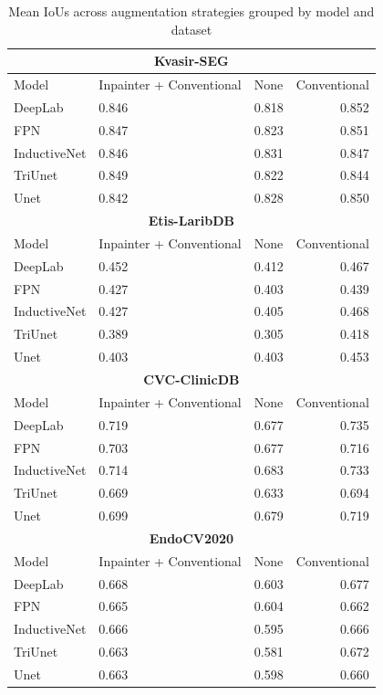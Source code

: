 \begin{table}[h!]
    \centering
   \begin{tabularx}{\linewidth}{llXr}
\toprule
        \multicolumn{4}{c}{\textbf{Kvasir-SEG}}\\
\toprule
Model & Inpainter + Conventional & None & Conventional\\
\midrule
            DeepLab &  0.846 &  0.818 &  0.852 \\
            FPN &  0.847 &  0.823 &  0.851 \\
           InductiveNet &  0.846 &  0.831 &  0.847 \\
           TriUnet &  0.849 &  0.822 &  0.844 \\
           Unet &  0.842 &  0.828 &  0.850 \\

\toprule
        \multicolumn{4}{c}{\textbf{Etis-LaribDB}}\\
\toprule
Model & Inpainter + Conventional & None & Conventional\\
\midrule
           DeepLab &  0.452 &  0.412 &  0.467 \\
           FPN &  0.427 &  0.403 &  0.439 \\
           InductiveNet &  0.427 &  0.405 &  0.468 \\
           TriUnet &  0.389 &  0.305 &  0.418 \\
           Unet &  0.403 &  0.403 &  0.453 \\
\toprule
        \multicolumn{4}{c}{\textbf{CVC-ClinicDB}}\\
\toprule
Model & Inpainter + Conventional & None & Conventional\\
\midrule
           DeepLab & 0.719 & 0.677 & 0.735 \\
           FPN &  0.703 &  0.677 &  0.716 \\
           InductiveNet &  0.714 &  0.683 &  0.733 \\
           TriUnet &  0.669 &  0.633 &  0.694 \\
           Unet &  0.699 &  0.679 &  0.719 \\
\toprule
        \multicolumn{4}{c}{\textbf{EndoCV2020}}\\
\toprule
Model & Inpainter + Conventional & None & Conventional\\
\midrule
           DeepLab &  0.668 &  0.603 &  0.677 \\
           FPN &  0.665 &  0.604 &  0.662 \\
           InductiveNet &  0.666 &  0.595 &  0.666 \\
           TriUnet &  0.663 &  0.581 &  0.672 \\
           Unet &  0.663 &  0.598 &  0.660 \\
\bottomrule
\end{tabularx}

    \caption{Mean IoUs across augmentation strategies grouped by model and dataset}
    \label{tab:aug_ious}
\end{table}

